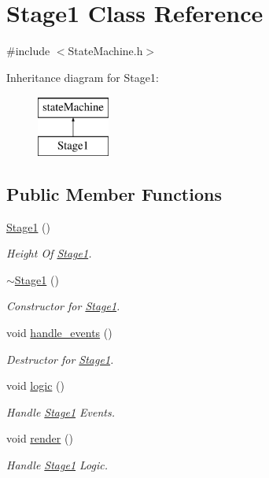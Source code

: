 \hypertarget{class_stage1}{\section{Stage1 Class Reference}
\label{class_stage1}
}


{\ttfamily \#include $<$State\-Machine.\-h$>$}

Inheritance diagram for Stage1\-:\begin{figure}[H]
\begin{center}
\leavevmode
\includegraphics[height=2.000000cm]{class_stage1}
\end{center}
\end{figure}
\subsection*{Public Member Functions}
\begin{DoxyCompactItemize}
\item 
\hyperlink{class_stage1_a18240000454d844b1c183a203eddbf4b}{Stage1} ()
\begin{DoxyCompactList}\small\item\em Height Of \hyperlink{class_stage1}{Stage1}. \end{DoxyCompactList}\item 
\hyperlink{class_stage1_a0bd922af78678696112fe8d4091cfa4f}{$\sim$\-Stage1} ()
\begin{DoxyCompactList}\small\item\em Constructor for \hyperlink{class_stage1}{Stage1}. \end{DoxyCompactList}\item 
void \hyperlink{class_stage1_ae746fd19bf35b78535618cd5484d970c}{handle\-\_\-events} ()
\begin{DoxyCompactList}\small\item\em Destructor for \hyperlink{class_stage1}{Stage1}. \end{DoxyCompactList}\item 
void \hyperlink{class_stage1_ae7fe27770d40d654297f044e693af030}{logic} ()
\begin{DoxyCompactList}\small\item\em Handle \hyperlink{class_stage1}{Stage1} Events. \end{DoxyCompactList}\item 
void \hyperlink{class_stage1_a60be0ff24305d7d018219f985b5b9323}{render} ()
\begin{DoxyCompactList}\small\item\em Handle \hyperlink{class_stage1}{Stage1} Logic. \end{DoxyCompactList}\end{DoxyCompactItemize}


